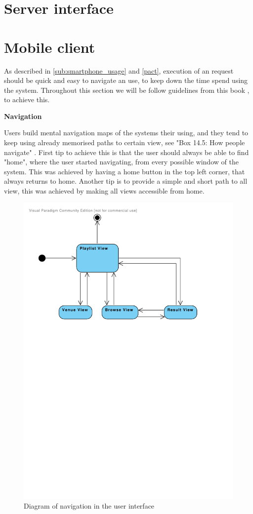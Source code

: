 \section{Server interface}

\section{Mobile client}

As described in \cref{sub:smartphone_usage} and \cref{pact}, execution of an request should be quick and easy to navigate an use, to keep down the time spend using the system. Throughout this section we will be follow guidelines from this book \cite{DEB}, to achieve this.

\textbf{Navigation}

Users build mental navigation maps of the systems their using, and they tend to keep using already memorised paths to certain view, see "Box 14.5: How people navigate" \cite{DEB}.
First tip to achieve this is that the user should always be able to find "home", where the user started navigating, from every possible window of the system. This was achieved by having a home button in the top left corner, that always returns to home.
Another tip is to provide a simple and short path to all view, this was achieved by making all views accessible from home. 

\begin{figure}
  \centering
  \includegraphics[width=0.5\linewidth]{Images/UserInterface.pdf}
  \caption{Diagram of navigation in the user interface}
  \label{fig:UserInterface}
\end{figure}

